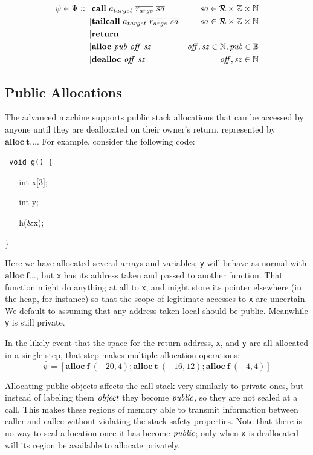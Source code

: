 \documentclass[10pt,conference]{ieeetran}%
\theoremstyle{definition}
\begin{document}
\begin{align*}
  \psi \in \Psi ::= & \mathbf{call} ~ a_{target} ~ \overline{r_{args}} ~ \overline{sa} &
  sa \in {\mathcal R} \times \mathbb{Z} \times \mathbb{N} \\
  | & \mathbf{tailcall} ~ a_{target}  ~ \overline{r_{args}} ~ \overline{sa} &
  sa \in {\mathcal R} \times \mathbb{Z} \times \mathbb{N} \\
  | & \mathbf{return} & \\
  | & \mathbf{alloc} ~ \mathit{pub} ~ \mathit{off ~ sz} & \mathit{off, sz} \in \mathbb{N}, \mathit{pub} \in \mathbb{B} \\
  | & \mathbf{dealloc} ~ \mathit{off ~ sz} & \mathit{off, sz} \in \mathbb{N} \\
\end{align*}

\subsection{Public Allocations}

The advanced machine supports public stack allocations that can
be accessed by anyone until they are deallocated on their owner's return,
represented by \(\mathbf{alloc} ~ \mathbf{t} \dots\).
For example, consider the following code:

{\tt
  void g() \{

  ~ ~ int x[3];

  ~ ~ int y;

  ~ ~ h(\&x);
    
  \}
}

Here we have allocated several arrays and variables; {\tt y}
will behave as normal with \(\mathbf{alloc} ~ \mathbf{f} \dots\), but
{\tt x} has its address taken and passed to another function. That
function might do anything at all to {\tt x}, and might store its pointer
elsewhere (in the heap, for instance) so that the scope of legitimate accesses
to {\tt x} are uncertain. We default to assuming that any address-taken local
should be public. Meanwhile {\tt y} is still private.

In the likely event that the space for the return address, {\tt x}, and {\tt y}
are all allocated in a single step, that step makes multiple allocation operations:
\[\bar{\psi} = [\mathbf{alloc} ~ \mathbf{f} ~ (-20,4);
 \mathbf{alloc} ~ \mathbf{t} ~ (-16,12) ; \mathbf{alloc} ~ \mathbf{f} ~ (-4,4)]\]

Allocating public objects affects the call stack very similarly to private ones,
but instead of labeling them \(\mathit{object}\) they become \(\mathit{public}\), so they are
not sealed at a call. This makes these
regions of memory able to transmit information between caller and callee without
violating the stack safety properties. Note that there is no way to seal a location
once it has become \(\mathit{public}\); only when {\tt x} is deallocated will its region
be available to allocate privately.
\end{document}
